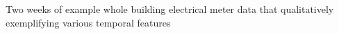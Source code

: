 Two weeks of example whole building electrical meter data that qualitatively exemplifying various temporal features
\label{fig:electricalmeters_twoweeks}